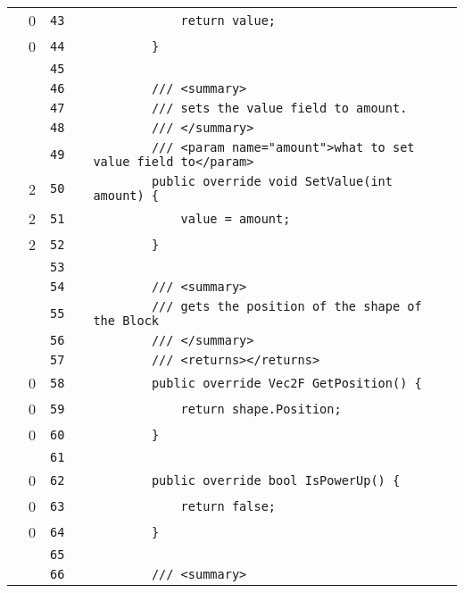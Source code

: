 \documentclass[a4paper,landscape,10pt]{article}
\begin{document}
\begin{longtable}[l]{lrrll}
\cellcolor{red} & 0 & \verb~43~ & & \verb~            return value;~\\
\cellcolor{red} & 0 & \verb~44~ & & \verb~        }~\\
\cellcolor{gray} &  & \verb~45~ & & \verb~~\\
\cellcolor{gray} &  & \verb~46~ & & \verb~        /// <summary>~\\
\cellcolor{gray} &  & \verb~47~ & & \verb~        /// sets the value field to amount.~\\
\cellcolor{gray} &  & \verb~48~ & & \verb~        /// </summary>~\\
\cellcolor{gray} &  & \verb~49~ & & \verb~        /// <param name="amount">what to set value field to</param>~\\
\cellcolor{green} & 2 & \verb~50~ & & \verb~        public override void SetValue(int amount) {~\\
\cellcolor{green} & 2 & \verb~51~ & & \verb~            value = amount;~\\
\cellcolor{green} & 2 & \verb~52~ & & \verb~        }~\\
\cellcolor{gray} &  & \verb~53~ & & \verb~~\\
\cellcolor{gray} &  & \verb~54~ & & \verb~        /// <summary>~\\
\cellcolor{gray} &  & \verb~55~ & & \verb~        /// gets the position of the shape of the Block~\\
\cellcolor{gray} &  & \verb~56~ & & \verb~        /// </summary>~\\
\cellcolor{gray} &  & \verb~57~ & & \verb~        /// <returns></returns>~\\
\cellcolor{red} & 0 & \verb~58~ & & \verb~        public override Vec2F GetPosition() {~\\
\cellcolor{red} & 0 & \verb~59~ & & \verb~            return shape.Position;~\\
\cellcolor{red} & 0 & \verb~60~ & & \verb~        }~\\
\cellcolor{gray} &  & \verb~61~ & & \verb~~\\
\cellcolor{red} & 0 & \verb~62~ & & \verb~        public override bool IsPowerUp() {~\\
\cellcolor{red} & 0 & \verb~63~ & & \verb~            return false;~\\
\cellcolor{red} & 0 & \verb~64~ & & \verb~        }~\\
\cellcolor{gray} &  & \verb~65~ & & \verb~~\\
\cellcolor{gray} &  & \verb~66~ & & \verb~        /// <summary>~\\

\end{longtable}
\end{document}
